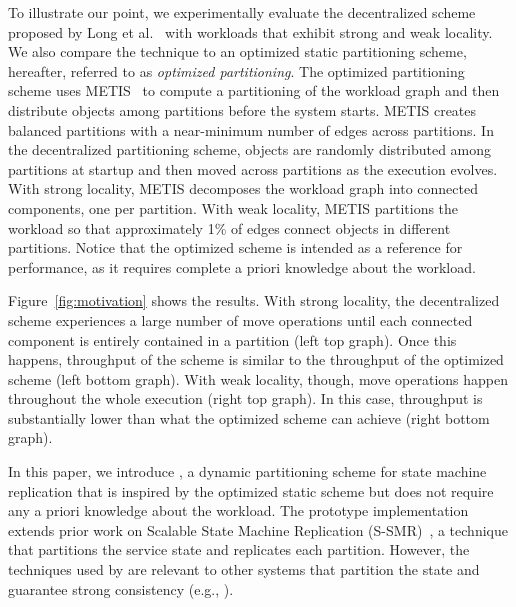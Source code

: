 To illustrate our point, we experimentally evaluate the decentralized
scheme proposed by Long et al.~\cite{hoang2016} with workloads that
exhibit strong and weak locality.  We also compare the technique to an
optimized static partitioning scheme, hereafter, referred to as
\emph{optimized partitioning}.  The optimized partitioning scheme uses
METIS~\cite{Abou-Rjeili:2006} to compute a partitioning of the
workload graph and then distribute objects among partitions before the
system starts.  METIS creates balanced partitions with a near-minimum
number of edges across partitions.  In the decentralized partitioning
scheme, objects are randomly distributed among partitions at startup
and then moved across partitions as the execution evolves.  With
strong locality, METIS decomposes the workload graph into connected
components, one per partition.  With weak locality, METIS partitions
the workload so that approximately 1\% of edges connect objects in
different partitions.  Notice that the optimized scheme is intended as
a reference for performance, as it requires complete a priori
knowledge about the workload.

Figure~\ref{fig:motivation} shows the results.  With strong locality,
the decentralized scheme experiences a large number of move operations
until each connected component is entirely contained in a partition
(left top graph).  Once this happens, throughput of the scheme is
similar to the throughput of the optimized scheme (left bottom graph).
With weak locality, though, move operations happen throughout the
whole execution (right top graph).  In this case, throughput is
substantially lower than what the optimized scheme can achieve (right
bottom graph).


In this paper, we introduce \dynastar, a dynamic partitioning scheme
for state machine replication that is inspired by the optimized static
scheme but does not require any a priori knowledge about the workload.
The \dynastar prototype implementation extends prior work on Scalable
State Machine Replication (S-SMR)~\cite{ssmr}, a technique that
partitions the service state and replicates each partition.  However,
the techniques used by \dynastar are relevant to other systems that
partition the state and guarantee strong consistency (e.g.,
\cite{xxx}).



